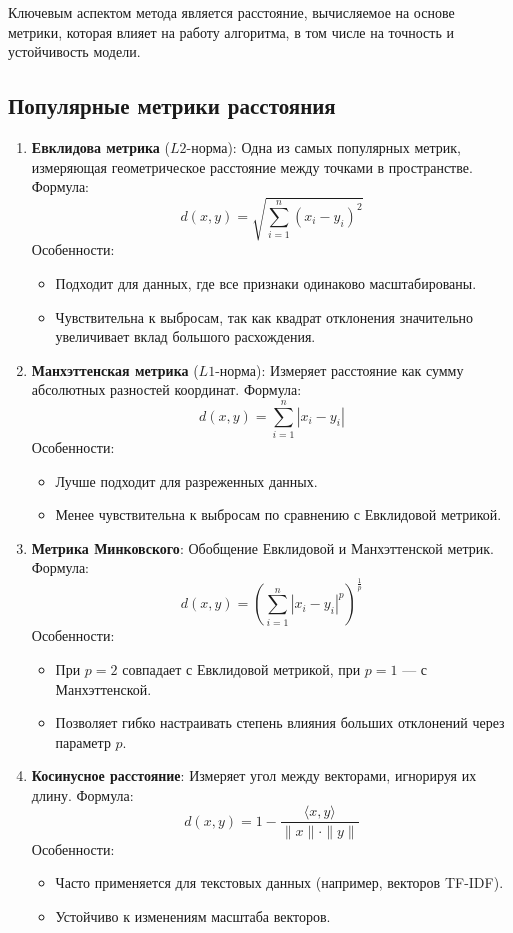 Ключевым аспектом метода является расстояние, вычисляемое на основе метрики, которая влияет на работу алгоритма, в том числе на точность и устойчивость модели.

\subsection{Популярные метрики расстояния}

\begin{enumerate}
    \item \textbf{Евклидова метрика} (\(L2\)-норма):
    Одна из самых популярных метрик, измеряющая геометрическое расстояние между точками в пространстве.
    Формула:
    \[
    d(x, y) = \sqrt{\sum_{i=1}^{n}(x_i - y_i)^2}
    \]
    Особенности:
    \begin{itemize}
        \item Подходит для данных, где все признаки одинаково масштабированы.
        \item Чувствительна к выбросам, так как квадрат отклонения значительно увеличивает вклад большого расхождения.
    \end{itemize}

    \item \textbf{Манхэттенская метрика} (\(L1\)-норма):
    Измеряет расстояние как сумму абсолютных разностей координат.
    Формула:
    \[
    d(x, y) = \sum_{i=1}^{n}|x_i - y_i|
    \]
    Особенности:
    \begin{itemize}
        \item Лучше подходит для разреженных данных.
        \item Менее чувствительна к выбросам по сравнению с Евклидовой метрикой.
    \end{itemize}

    \item \textbf{Метрика Минковского}:
    Обобщение Евклидовой и Манхэттенской метрик.
    Формула:
    \[
    d(x, y) = \left(\sum_{i=1}^{n}|x_i - y_i|^p\right)^{\frac{1}{p}}
    \]
    Особенности:
    \begin{itemize}
        \item При \(p=2\) совпадает с Евклидовой метрикой, при \(p=1\) — с Манхэттенской.
        \item Позволяет гибко настраивать степень влияния больших отклонений через параметр \(p\).
    \end{itemize}

    \item \textbf{Косинусное расстояние}:
    Измеряет угол между векторами, игнорируя их длину.
    Формула:
    \[
    d(x, y) = 1 - \frac{\langle x, y \rangle}{\|x\| \cdot \|y\|}
    \]
    Особенности:
    \begin{itemize}
        \item Часто применяется для текстовых данных (например, векторов TF-IDF).
        \item Устойчиво к изменениям масштаба векторов.
    \end{itemize}


\end{enumerate}
